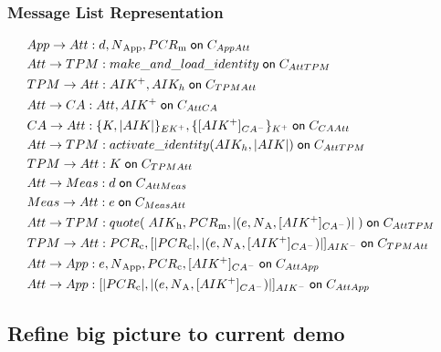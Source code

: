 \documentclass{beamer}
\def \pmask {PCR\textsubscript{m}}
\def \pcomp {PCR\textsubscript{c}}
\def \evd {d}
\def \eve {e}
\def \cacert {\sign {\public{AIK}}{CA}}
\def \exdata {\hash{(\eve, \nonce{A}, \cacert ) }}
\def \aikh {AIK_h}
\def \app {App}
\def \att {Att}
\def \ca {CA}
\def \mea {Meas}
\def \tp {TPM}
\begin{document}
\begin{frame}
  \frametitle{Message List Representation}
  \begin{small}
  \begin{align*}
  & \sndmsg {\app}{\att} {\evd, \nonce{\app}, \pmask} {\channel {\app \att}}  & \\
  & \sndmsg{\att}{\tp} {make\_and\_load\_identity} {\channel {\att \tp}} & \\
  & \sndmsg{\tp}{\att} {\public{AIK}, \aikh} {\channel {\tp \att}} & \\
  & \sndmsg{\att}{\ca} {\att, \public{AIK}} {\channel {\att \ca}} & \\
  & \sndmsg{\ca}{\att} {\encrypt{K, \hash{AIK}}{EK}, \encrypt{\cacert}{K}} {\channel {\ca \att}}& \\
  & \sndmsg{\att}{\tp} {activate\_identity({\aikh, \hash{AIK})}} {\channel {\att \tp}} & \\
  & \sndmsg{\tp}{\att} {K} {\channel {\tp \att}} & \\
  & \sndmsg{\att}{\mea} {\evd} {\channel {\att \mea}} & \\
  & \sndmsg{\mea}{\att} {\eve} {\channel {\mea \att}} & \\
  & \sndmsg{\att}{\tp} {quote(\;{AIK\textsubscript{h}, \pmask, \exdata}\;)} {\channel {\att \tp}} & \\
  & \sndmsg{\tp}{\att} {\pcomp, \sign{\hash{\pcomp}, \exdata}{AIK}} {\channel {\tp \att}} & \\
  & \sndmsg{\att}{\app} {\eve, \nonce{\app}, \pcomp, \cacert} {\channel {\att \app}} & \\
  & \sndmsg{\att}{\app} {\sign{\hash{\pcomp}, \exdata}{AIK}} {\channel {\att \app}} & 
\end{align*}
\end{small}
\end{frame}

\subsection{Refine big picture to current demo}
\end{document}
